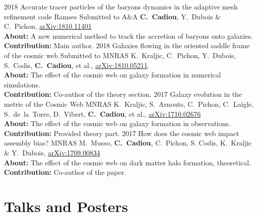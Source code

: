 \documentclass[]{cv-style}
\begin{document}
\begin{entrylist}
\entry
{2018}
{Accurate tracer particles of the baryons dynamics in the adaptive mesh refinement code Ramses}
{Submitted to A\&A}
{\textbf{C.~Cadiou}, Y.~Dubois \& C.~Pichon, \href{http://adsabs.harvard.edu/cgi-bin/bib_query?arXiv:1810.11401}{arXiv:1810.11401}\\ %
  {\bf About:} A new numerical method to track the accretion of baryons onto galaxies.\\
  {\bf Contribution:} Main author.
}
\entry
{2018}
{Galaxies flowing in the oriented saddle frame of the cosmic web}
{Submitted to MNRAS}
{K.~Kraljic, C.~Pichon, Y.~Dubois, S.~Codis, \textbf{C.~Cadiou}, et al., \href{http://adsabs.harvard.edu/cgi-bin/bib_query?arXiv:1810.05211}{arXiv:1810.05211}.\\
  {\bf About:} The effect of the cosmic web on galaxy formation in numerical simulations.\\
  {\bf Contribution:} Co-author of the theory section.
}
\entry
{2017}
{Galaxy evolution in the metric of the Cosmic Web}
{MNRAS}
{K.~Kraljic, S.~Arnouts, C.~Pichon, C.~Laigle, S.~de~la~Torre,
  D.~Vibert, \textbf{C.~Cadiou}, et al., \href{http://adsabs.harvard.edu/cgi-bin/bib_query?arXiv:1710.02676}{arXiv:1710.02676}\\
  {\bf About:} The effect of the cosmic web on galaxy formation in observations.\\
  {\bf Contribution:} Provided theory part.
}
\entry
{2017}
{How does the cosmic web impact assembly bias?}
{MNRAS}
{M.~Musso, \textbf{C.~Cadiou}, C.~Pichon, S. Codis, K.~Kraljic  \& Y.~Dubois,
  \href{http://adsabs.harvard.edu/cgi-bin/bib_query?arXiv:1709.00834}{arXiv:1709.00834}\\
  {\bf About:} The effect of the cosmic web on dark matter halo formation, theoretical.\\
  {\bf Contribution:} Co-author of the paper.
}
\end{entrylist}

\section{Talks and Posters}
\end{document}
